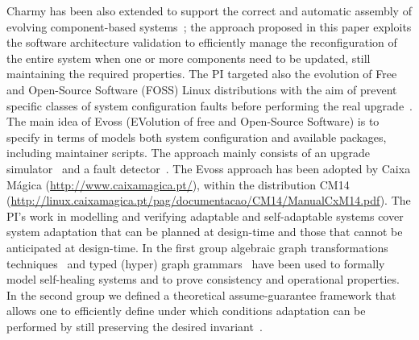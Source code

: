 \documentclass[12pt]{article}
\begin{document}
Charmy has been also extended to support the correct and automatic assembly of evolving component-based systems~\cite{Pelliccione20082237}; the approach proposed in this paper exploits the software architecture validation to efficiently manage the reconfiguration of the entire system when one or more components need to be updated, still maintaining the required properties. The PI targeted also the evolution of Free and Open-Source Software (FOSS) Linux distributions with the aim of prevent specific classes of system configuration faults before performing the real upgrade~\cite{DiCosmo2011,DiRuscio2014,DiRuscio2015}. The main idea of Evoss (EVolution of free and Open-Source Software) is to specify in terms of models both system configuration and available packages, including maintainer scripts. The approach mainly consists of an upgrade simulator~\cite{DiRuscio2014} and a fault detector~\cite{DiRuscio2015}. 
The Evoss approach has been adopted by Caixa M\'agica ({\small \url{http://www.caixamagica.pt/}}), within the distribution CM14 ({\small \url{http://linux.caixamagica.pt/pag/documentacao/CM14/ManualCxM14.pdf}}).
The PI's work in modelling and verifying adaptable and self-adaptable systems cover system adaptation that can be planned at design-time and those that cannot be anticipated at design-time. In the first group algebraic graph transformations techniques~\cite{WICSA2009} and typed (hyper) graph grammars~\cite{Bucchiarone2015,Ehrig2010} have been used to formally model self-healing systems and to prove consistency and operational properties. In the second group we defined a theoretical assume-guarantee framework that allows one to efficiently define under which conditions adaptation can be performed by still preserving the desired invariant~\cite{IPT09}. 
\end{document}
